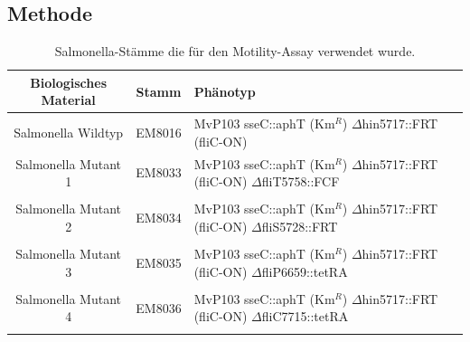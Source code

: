 \documentclass[oneside,10pt,a4paper]{report}
\begin{document}
			\subsection{Methode}
				\begin{table}[H]
				\centering
				\caption{Salmonella-Stämme die für den Motility-Assay verwendet wurde.}
				\label{tab: exp6-biologisches Material part3}
				\begin{tabular}{ccp{5cm}}
					\toprule
					Biologisches Material& Stamm & Phänotyp\\
					\midrule
					\multirow{3}{*}{\parbox[t]{2cm}{Salmonella Wildtyp }}  & \multirow{3}{*}{EM8016} & \multirow{3}{*}{\parbox[t]{4.5cm}{MvP103 sseC::aphT (Km$^R$) $\Delta$hin5717::FRT (fliC-ON)}}\\
					&&\\
					&&\\
					\multirow{3}{*}{\parbox[t]{2cm}{Salmonella Mutant 1}}  & \multirow{3}{*}{EM8033} & \multirow{3}{*}{\parbox[t]{4.5cm}{MvP103 sseC::aphT (Km$^R$) $\Delta$hin5717::FRT (fliC-ON) $\Delta$fliT5758::FCF}}\\
					&&\\
					&&\\
					&&\\
					\multirow{3}{*}{\parbox[t]{2cm}{Salmonella Mutant 2}}  & \multirow{3}{*}{EM8034} & \multirow{3}{*}{\parbox[t]{4.5cm}{MvP103 sseC::aphT (Km$^R$) $\Delta$hin5717::FRT (fliC-ON) $\Delta$fliS5728::FRT}}\\
					&&\\
					&&\\
					&&\\
					\multirow{3}{*}{\parbox[t]{2cm}{Salmonella Mutant 3}} & \multirow{3}{*}{EM8035} &\multirow{3}{*}{\parbox[t]{4.5cm}{MvP103 sseC::aphT (Km$^R$) $\Delta$hin5717::FRT (fliC-ON) $\Delta$fliP6659::tetRA}} \\
					&&\\
					&&\\
					&&\\
					\multirow{3}{*}{\parbox[t]{2cm}{Salmonella Mutant 4}} & \multirow{3}{*}{EM8036} &\multirow{3}{*}{\parbox[t]{4.5cm}{MvP103 sseC::aphT (Km$^R$) $\Delta$hin5717::FRT (fliC-ON) $\Delta$fliC7715::tetRA}} \\
					&&\\
					&&\\
					&&\\
					\bottomrule			
				\end{tabular}
			\end{table}
			
\end{document}
